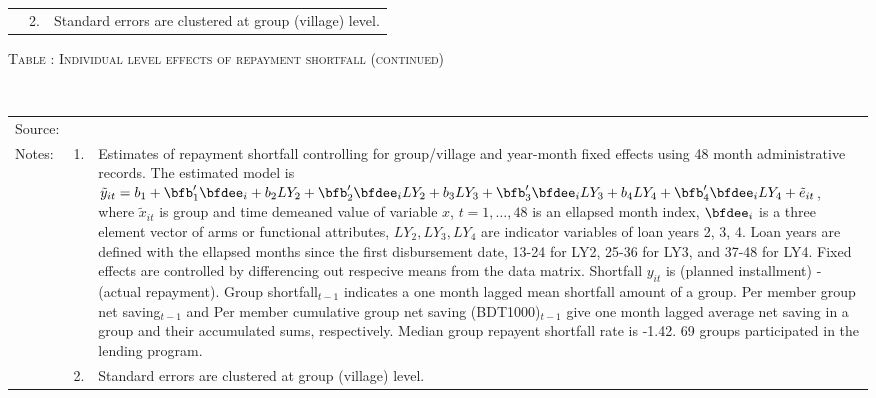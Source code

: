 \begin{minipage}[t]{14cm}
\begin{tabular}{>{\hfill\scriptsize}p{1cm}<{}>{\hfill\scriptsize}p{.25cm}<{}>{\scriptsize}p{12cm}<{\hfill}}
& 2. & Standard errors are clustered at group (village) level.
\end{tabular}
\end{minipage}

\addtocounter{table}{-1}
\hspace{-1cm}\begin{minipage}[t]{14cm}
\hfil\textsc{\normalsize Table \thetable: Individual level effects of repayment shortfall (continued)\label{tab shortfall indiv o800 3}}\\
\setlength{\tabcolsep}{1pt}
\setlength{\baselineskip}{8pt}
\renewcommand{\arraystretch}{.6}
\hfil{}\\
\renewcommand{\arraystretch}{.8}
\setlength{\tabcolsep}{1pt}
\begin{tabular}{>{\hfill\scriptsize}p{1cm}<{}>{\hfill\scriptsize}p{.25cm}<{}>{\scriptsize}p{12cm}<{\hfill}}
Source:& \multicolumn{2}{l}{\scriptsize Estimated with GUK administrative data.}\\
Notes: & 1. & Estimates of repayment shortfall controlling for group/village and year-month fixed effects using 48 month administrative records. The estimated model is $\tilde{y}_{it}=b_{1}+\bfb'_{1}\bfdee_{i}+b_{2}LY_{2}+\bfb'_{2}\bfdee_{i}LY_{2}+b_{3}LY_{3}+\bfb'_{3}\bfdee_{i}LY_{3}+b_{4}LY_{4}+\bfb'_{4}\bfdee_{i}LY_{4}+\tilde{e}_{it}$, where $\tilde{x}_{it}$ is group and time demeaned value of variable $x$, $t=1,\dots, 48$ is an ellapsed month index, $\bfdee_{i}$ is a three element vector of arms or functional attributes, $LY_{2}, LY_{3}, LY_{4}$ are indicator variables of loan years 2, 3, 4. Loan years are defined with the ellapsed months since the first disbursement date, 13-24 for \textsf{LY2}, 25-36 for \textsf{LY3}, and 37-48 for \textsf{LY4}. Fixed effects are controlled by differencing out respecive means from the data matrix. Shortfall $y_{it}$ is (planned installment) - (actual repayment). \textsf{Group shortfall}$_{t-1}$ indicates a one month lagged mean shortfall amount of a group. \textsf{Per member group net saving}$_{t-1}$ and \textsf{Per member cumulative group net saving (BDT1000)}$_{t-1}$ give one month lagged average net saving in a group and their accumulated sums, respectively. Median group repayent shortfall rate is -1.42. 69 groups participated in the lending program. \\
& 2. & Standard errors are clustered at group (village) level.
\end{tabular}
\end{minipage}

